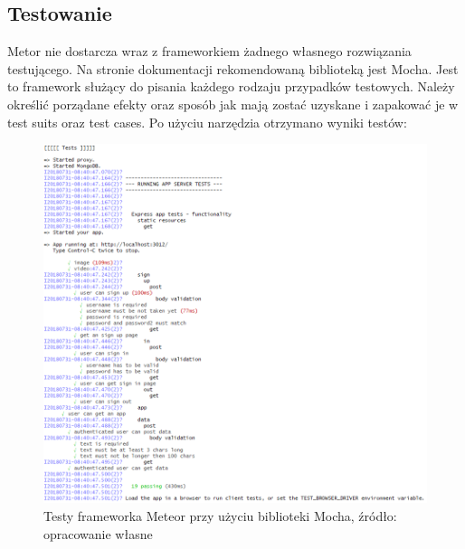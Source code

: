 \documentclass[12pt]{report}
\begin{document}
    \subsection{Testowanie}
      Metor nie dostarcza wraz z frameworkiem żadnego własnego rozwiązania testującego.
      Na stronie dokumentacji rekomendowaną biblioteką jest Mocha.
      Jest to framework służący do pisania każdego rodzaju przypadków testowych.
      Należy określić porządane efekty oraz sposób jak mają zostać uzyskane i zapakować je w test suits oraz test cases.
      Po użyciu narzędzia otrzymano wyniki testów:
      \begin{figure}[!hb]
        \centering
        \includegraphics[width=\textwidth,height=\textheight,keepaspectratio]{test_meteor.png} 
        \caption{Testy frameworka Meteor przy użyciu biblioteki Mocha, źródło: opracowanie własne}
      \end{figure}
\end{document}
